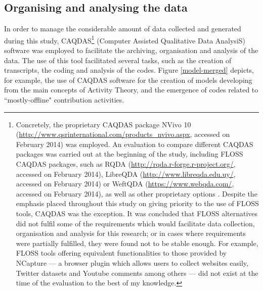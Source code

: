 \subsection{Organising and analysing the data}
\label{organising-caqdas}

In order to manage the considerable amount of data collected and generated during this study, CAQDAS\footnote{Concretely, the proprietary CAQDAS package NVivo 10 (\url{http://www.qsrinternational.com/products_nvivo.aspx}, accessed on  February 2014) was employed. An evaluation to compare different CAQDAS packages was carried out at the beginning of the study, including FLOSS CAQDAS packages, such as RQDA (\url{http://rqda.r-forge.r-project.org/}, accessed on  February 2014), LibreQDA (\url{http://www.libreqda.edu.uy/}, accessed on  February 2014) or WeftQDA (\url{https://www.webqda.com/}, accessed on  February 2014), as well as other proprietary options \parencite{caqdas2009}. Despite the emphasis placed throughout this study on giving priority to the use of FLOSS tools, CAQDAS was the exception. It was concluded that FLOSS alternatives did not fulfil some of the requirements which would facilitate data collection, organisation and analysis for this research; or in cases where requirements were partially fulfilled, they were found not to be stable enough. For example, FLOSS tools offering equivalent functionalities to those provided by NCapture --- a browser plugin which allows users to collect websites easily, Twitter datasets and Youtube comments among others --- did not exist at the time of the evaluation to the best of my knowledge.} (Computer Assisted Qualitative Data AnalysiS) software was employed to facilitate the archiving, organisation and analysis of the data. The use of this tool facilitated several tasks, such as the creation of transcripts, the coding and analysis of the codes. Figure \ref{model-merged} depicts, for example, the use of CAQDAS software for the creation of models developing from the main concepts of Activity Theory, and the emergence of codes related to ``mostly-offline" contribution activities.

